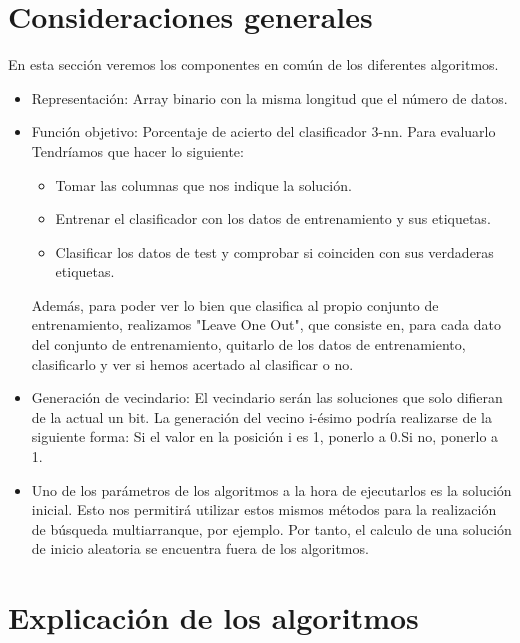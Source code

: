 \section{Consideraciones generales}
En esta sección veremos los componentes en común de los diferentes algoritmos.
\begin{itemize}
\item Representación: Array binario con la misma longitud que el número de datos.
\item Función objetivo: Porcentaje de acierto del clasificador 3-nn. Para evaluarlo Tendríamos que hacer lo siguiente:
\begin{itemize}
\item Tomar las columnas que nos indique la solución.
\item Entrenar el clasificador con los datos de entrenamiento y sus etiquetas.
\item Clasificar los datos de test y comprobar si coinciden con sus verdaderas etiquetas.
\end{itemize} 
Además, para poder ver lo bien que clasifica al propio conjunto de entrenamiento, realizamos "Leave One Out", que consiste en, para cada dato del conjunto de entrenamiento, quitarlo de los datos de entrenamiento, clasificarlo y ver si hemos acertado al clasificar o no.
\item Generación de vecindario: El vecindario serán las soluciones que solo difieran de la actual un bit. La generación del vecino i-ésimo podría realizarse de la siguiente forma: Si el valor en la posición i es 1, ponerlo a 0.Si no, ponerlo a 1. 
\item Uno de los parámetros de los algoritmos a la hora de ejecutarlos es la solución inicial. Esto nos permitirá utilizar estos mismos métodos para la realización de búsqueda multiarranque, por ejemplo. Por tanto, el calculo de una solución de inicio aleatoria se encuentra fuera de los algoritmos.
\end{itemize}
\newpage
\section{Explicación de los algoritmos}

